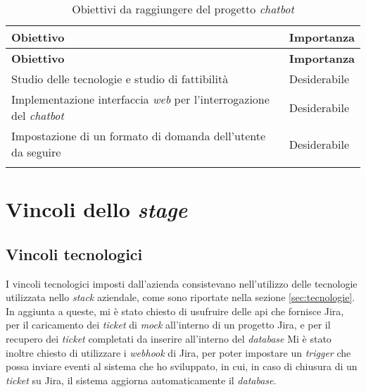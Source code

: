 \begin{longtable}{|p{10cm}|p{2cm}|}
    \hline
    \rowcolor{tableheader}\textbf{Obiettivo} & \textbf{Importanza} \\
    \hline
    \endfirsthead

    \rowcolor{tableheader}\textbf{Obiettivo} & \textbf{Importanza} \\
    \hline
    \endhead

    \hline
    \endfoot

    \hline
    \endlastfoot
    \rowcolor{tableoddrow} Studio delle tecnologie e studio di fattibilità & Desiderabile \\
    \hline
    \rowcolor{tableevenrow} Implementazione interfaccia \textit{web} per l'interrogazione del \textit{chatbot} & Desiderabile \\
    \hline
    \rowcolor{tableevenrow} Impostazione di un formato di domanda dell'utente da seguire & Desiderabile \\
    \hline
    \caption{Obiettivi da raggiungere del progetto \textit{chatbot}}
    \label{tab:obiettiviChatbot}
\end{longtable}
\section{Vincoli dello \textit{stage}}
\subsection{Vincoli tecnologici}
I vincoli tecnologici imposti dall'azienda consistevano nell'utilizzo delle tecnologie utilizzata nello \textit{stack} aziendale, come sono riportate nella sezione \ref{sec:tecnologie}. In aggiunta a queste, 
mi è stato chiesto di usufruire delle \gls{api} che fornisce Jira, per il caricamento dei \textit{ticket} di \textit{mock} all'interno di un progetto Jira, e per il recupero dei \textit{ticket} completati da inserire all'interno del \textit{database}
Mi è stato inoltre chiesto di utilizzare i \textit{webhook} di Jira, per poter impostare un \textit{trigger} che possa inviare eventi al sistema che ho sviluppato, in cui, in caso di chiusura di un \textit{ticket} su Jira, il sistema aggiorna automaticamente il \textit{database}.
